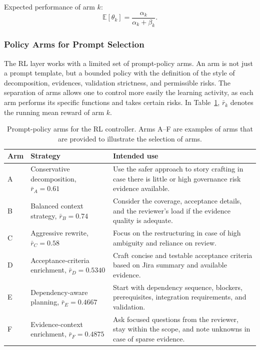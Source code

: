 \documentclass[manuscript,review]{acmart}
\begin{document}
Expected performance of arm $k$:
\begin{equation}
\mathbb{E}[\theta_k] = \frac{\alpha_k}{\alpha_k+\beta_k}.
\end{equation}

\subsubsection{Policy Arms for Prompt Selection}

The RL layer works with a limited set of prompt-policy arms. An arm is not just a prompt template, but a bounded policy with the definition of the style of decomposition, evidences, validation strictness, and permissible risks. The separation of arms allows one to control more easily the learning activity, as each arm performs its specific functions and takes certain risks. In Table~\ref{tab:policy-arms}, $\bar r_k$ denotes the running mean reward of arm $k$.

\begin{table}[htbp]
\centering
\small
\caption{Prompt-policy arms for the RL controller. Arms A--F are examples of arms that are provided to illustrate the selection of arms.}
\label{tab:policy-arms}
\begin{tabularx}{\columnwidth}{@{}p{}p{}X@{}}
\toprule
Arm & Strategy & Intended use \\
\midrule
A & Conservative decomposition, $\bar r_A=0.61$ & Use the safer approach to story crafting in case there is little or high governance risk evidence available. \\
B & Balanced context strategy, $\bar r_B=0.74$ & Consider the coverage, acceptance details, and the reviewer's load if the evidence quality is adequate. \\
C & Aggressive rewrite, $\bar r_C=0.58$ & Focus on the restructuring in case of high ambiguity and reliance on review. \\
D & Acceptance-criteria enrichment, $\bar r_D=0.5340$ & Craft concise and testable acceptance criteria based on Jira summary and available evidence. \\
E & Dependency-aware planning, $\bar r_E=0.4667$ & Start with dependency sequence, blockers, prerequisites, integration requirements, and validation. \\
F & Evidence-context enrichment, $\bar r_F=0.4875$ & Ask focused questions from the reviewer, stay within the scope, and note unknowns in case of sparse evidence. \\
\bottomrule
\end{tabularx}
\end{table}
\end{document}
